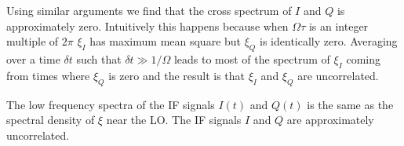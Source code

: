 
Using similar arguments we find that the cross spectrum of $I$ and $Q$ is approximately zero.
Intuitively this happens because when $\Omega \tau$ is an integer multiple of $2\pi$ $\xi_I$ has maximum mean square but $\xi_Q$ is identically zero.
Averaging over a time $\delta t$ such that $\delta t \gg 1 / \Omega$ leads to most of the spectrum of $\xi_I$ coming from times where $\xi_Q$ is zero and the result is that $\xi_I$ and $\xi_Q$ are uncorrelated.


The low frequency spectra of the IF signals $I(t)$ and $Q(t)$ is the same as the spectral density of $\xi$ near the LO.
The IF signals $I$ and $Q$ are approximately uncorrelated.
